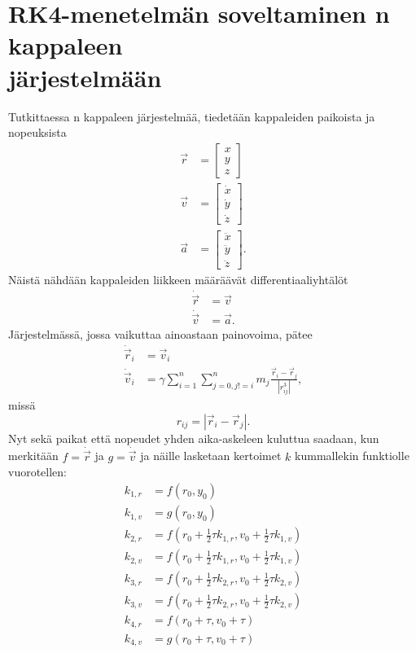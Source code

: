 \documentclass[12pt,a4paper,titlepage]{article}
\begin{document}
\section{RK4-menetelmän soveltaminen n kappaleen\\järjestelmään}
Tutkittaessa n kappaleen järjestelmää, tiedetään kappaleiden paikoista ja nopeuksista
\begin{align*}
	\vec{r} &=
	\begin{bmatrix}
		x \\
		y \\
		z
	\end{bmatrix}\\
	\vec{v} &=
	\begin{bmatrix}
		\dot x \\
		\dot y \\
		\dot z
	\end{bmatrix}\\
	\vec{a} &=
	\begin{bmatrix}
		\ddot x \\
		\ddot y \\
		\ddot z
	\end{bmatrix}.
\end{align*}
Näistä nähdään kappaleiden liikkeen määräävät differentiaaliyhtälöt
\begin{align*}
	\dot\vec{r} &= \vec{v}\\
	\dot\vec{v} &= \vec{a}.
\end{align*}
Järjestelmässä, jossa vaikuttaa ainoastaan painovoima, pätee
\begin{align*}
	\dot\vec{r}_i &= \vec{v}_i \\
	\dot\vec{v}_i &= \gamma \sum_{i=1}^n\sum_{j=0, j!=i}^n{m_j\frac{\vec{r}_i-\vec{r}_j}{|{r_{ij}^3}|}},
\end{align*}
missä
\begin{equation*}
	r_{ij} = |\vec r_i - \vec r_j |.
\end{equation*}
Nyt sekä paikat että nopeudet yhden aika-askeleen kuluttua saadaan, kun merkitään $f = \dot\vec{r}$ ja $g = \dot\vec{v}$ ja näille lasketaan kertoimet $k$ kummallekin funktiolle vuorotellen:
\begin{align*}
	k_{1,r} &= f(r_0, y_0)\\
	k_{1,v} &= g(r_0, y_0)\\
	k_{2,r} &= f(r_0 + \frac{1}{2}\tau k_{1,r}, v_0 + \frac{1}{2}\tau k_{1,v})\\
	k_{2,v} &= f(r_0 + \frac{1}{2}\tau k_{1,r}, v_0 + \frac{1}{2}\tau k_{1,v})\\
	k_{3,r} &= f(r_0 + \frac{1}{2}\tau k_{2,r}, v_0 + \frac{1}{2}\tau k_{2,v})\\
	k_{3,v} &= f(r_0 + \frac{1}{2}\tau k_{2,r}, v_0 + \frac{1}{2}\tau k_{2,v})\\
	k_{4,r} &= f(r_0 + \tau, v_0 + \tau)\\
	k_{4,v} &= g(r_0 + \tau, v_0 + \tau)
\end{align*}
\end{document}
